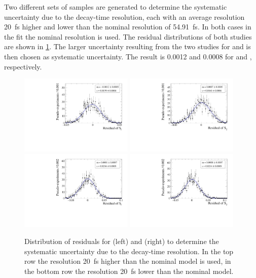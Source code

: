 Two different sets of samples are generated to determine the systematic uncertainty due to the decay-time resolution, each with an average resolution \SI{20}{\femto\second} higher and lower than the nominal resolution of \SI{54.91}{\femto\second}.
In both cases in the fit the nominal resolution is used.
The residual distributions of both studies are shown in \cref{fig:systUncertRes}.
The larger uncertainty resulting from the two studies for \Sf and \Sfbar is then chosen as systematic uncertainty.
The result is \num{0.0012} and \num{0.0008} for \Sf and \Sfbar, respectively.
\begin{figure}[tbp]
    \centering
    \includegraphics[width=0.48\textwidth]{10Systematics/figs/ResHigh_Sf_res.pdf}
    \includegraphics[width=0.48\textwidth]{10Systematics/figs/ResHigh_Sfbar_res.pdf}\\
    \includegraphics[width=0.48\textwidth]{10Systematics/figs/ResLow_Sf_res.pdf}
    \includegraphics[width=0.48\textwidth]{10Systematics/figs/ResLow_Sfbar_res.pdf}
    \caption{Distribution of residuals for \Sf (left) and \Sfbar (right) to determine the systematic uncertainty due to the decay-time resolution.
    In the top row the resolution \SI{20}{\femto\second} higher than the nominal model is used, in the bottom row the resolution \SI{20}{\femto\second} lower than the nominal model.}
    \label{fig:systUncertRes}
\end{figure}

